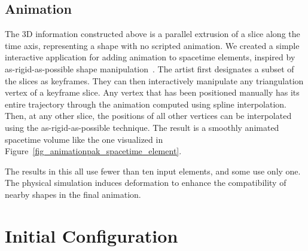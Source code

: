 \subsection{Animation}
\label{animationpak_animation}

The 3D information constructed above is a parallel extrusion of a 
slice along the time axis, representing a shape with no scripted animation.
We created a simple interactive application for adding animation to
spacetime elements, inspired by as-rigid-as-possible shape
manipulation~\cite{Igarashi2005}.  The artist first designates a subset
of the slices as keyframes.  They can then interactively manipulate
any triangulation vertex of a keyframe slice.  Any vertex that has
been positioned manually has its entire trajectory through the animation
computed using spline interpolation.  Then, at any other slice, the positions
of all other vertices can be interpolated using the as-rigid-as-possible
technique.  The result is a smoothly animated spacetime volume like the one
visualized in Figure~\ref{fig_animationpak_spacetime_element}.

  The results in this  all use
fewer than ten input elements, and some use only one.
The physical simulation induces deformation to enhance 
the compatibility of nearby shapes in the final animation.

\section{Initial Configuration}
\label{animationpak_initial_configuration}





